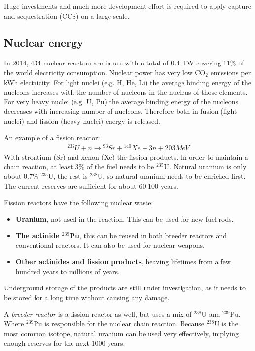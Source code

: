 \documentclass[a4paper,10pt]{article}
\begin{document}
Huge investments and much more development effort is required to apply capture and sequestration (CCS) on a large scale.

\subsection{Nuclear energy}
In 2014, 434 nuclear reactors are in use with a total of 0.4 TW covering 11\% of the world electricity consumption. Nuclear power has very low CO$_2$ emissions per kWh electricity. For light nuclei (e.g. H, He, Li) the average binding energy of the nucleons increases with the number of nucleons in the nucleus of those elements. For very heavy nuclei (e.g. U, Pu) the average binding energy of the nucleons decreases with increasing number of nucleons. Therefore both in fusion (light nuclei) and fission (heavy nuclei) energy is released. \bigskip

An example of a fission reactor:
\begin{align}
 {^{235}}U + n \rightarrow {^{93}}Sr + {^{140}}Xe + 3n + 203 MeV
\end{align}
With strontium (Sr) and xenon (Xe) the fission products. In order to maintain a chain reaction, at least 3\% of the fuel needs to be ${^{235}}$U. Natural uranium is only about 0.7\% ${^{235}}$U, the rest is ${^{238}}$U, so natural uranium needs to be enriched first. The current reserves are sufficient for about 60-100 years. \bigskip

Fission reactors have the following nuclear waste:
\begin{itemize}
 \item \textbf{Uranium}, not used in the reaction. This can be used for new fuel rods.
 \item \textbf{The actinide ${^{239}}$Pu}, this can be reused in both breeder reactors and conventional reactors. It can also be used for nuclear weapons.
 \item \textbf{Other actinides and fission products}, heaving lifetimes from a few hundred years to millions of years.
\end{itemize}

Underground storage of the products are still under investigation, as it needs to be stored for a long time without causing any damage. \bigskip

A \emph{breeder reactor} is a fission reactor as well, but uses a mix of ${^{238}}$U and ${^{239}}$Pu. Where ${^{239}}$Pu is responsible for the nuclear chain reaction. Because ${^{238}}$U is the most common isotope, natural uranium can be used very effectively, implying enough reserves for the next 1000 years. \bigskip
\end{document}
